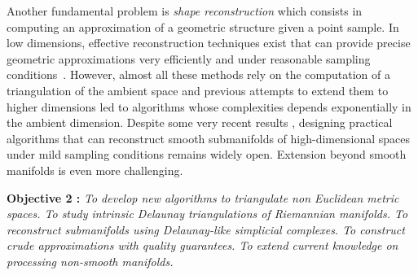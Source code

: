 Another fundamental problem is {\em shape reconstruction} which consists in computing an approximation of a geometric structure given a point sample.  In low dimensions, effective reconstruction techniques exist that can provide precise geometric approximations very efficiently and under reasonable sampling conditions~\cite{dey-csr-2007}. %
However,   almost all these methods rely on the computation of a triangulation of the ambient space and previous attempts to extend them to higher dimensions led to algorithms whose complexities depends exponentially in the ambient dimension.  Despite some very recent results \cite{geometrica-7142i}, designing practical algorithms that can reconstruct smooth submanifolds of high-dimensional spaces under mild sampling conditions remains widely open. Extension beyond smooth manifolds is even more challenging.


\vspace{2mm}

{\bf Objective 2 :}  {\em To   develop new algorithms to {\em  triangulate non Euclidean metric spaces}. To study intrinsic Delaunay triangulations of Riemannian manifolds.  To reconstruct submanifolds using Delaunay-like simplicial complexes. To construct crude approximations 
with quality guarantees. To extend current knowledge on processing non-smooth manifolds. }

